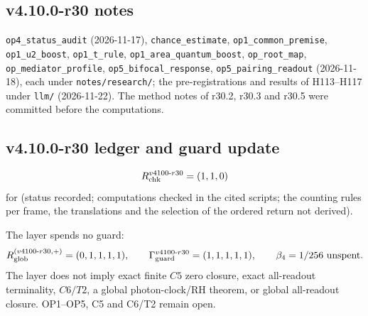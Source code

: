 \subsection*{v4.10.0-r30 notes}
\label{subsec:v4100-r30-notes}

\texttt{op4\_\allowbreak status\_\allowbreak audit} (2026-11-17), \texttt{chance\_\allowbreak estimate}, \texttt{op1\_\allowbreak common\_\allowbreak premise},
\texttt{op1\_\allowbreak u2\_\allowbreak boost}, \texttt{op1\_\allowbreak t\_\allowbreak rule}, \texttt{op1\_\allowbreak area\_\allowbreak quantum\_\allowbreak boost},
\texttt{op\_\allowbreak root\_\allowbreak map}, \texttt{op\_\allowbreak mediator\_\allowbreak profile}, \texttt{op5\_\allowbreak bifocal\_\allowbreak response},
\texttt{op5\_\allowbreak pairing\_\allowbreak readout} (2026-11-18), each under \texttt{notes/\allowbreak research/}; the pre-registrations and results of
H113--H117 under \texttt{llm/} (2026-11-22).  The method notes of r30.2, r30.3 and r30.5 were committed before the computations.

\subsection*{v4.10.0-r30 ledger and guard update}
\label{subsec:v4100-r30-ledger-guard}

\[
R_{\rm chk}^{v4100\text{-}r30}=(1,1,0)
\]
for (status recorded; computations checked in the cited scripts; the counting rules per frame, the translations and the selection of the ordered
return not derived).

The layer spends no guard:
\[
R_{\rm glob}^{(v4100\text{-}r30,+)}=(0,1,1,1,1),
\qquad
\Gamma_{\rm guard}^{v4100\text{-}r30}=(1,1,1,1,1),
\qquad
\beta_4=1/256\ \text{unspent}.
\]
The layer does not imply exact finite \(C5\) zero closure, exact all-readout terminality, \(C6/T2\), a global photon-clock/RH theorem,
or global all-readout closure.  OP1--OP5, C5 and C6/T2 remain open.
